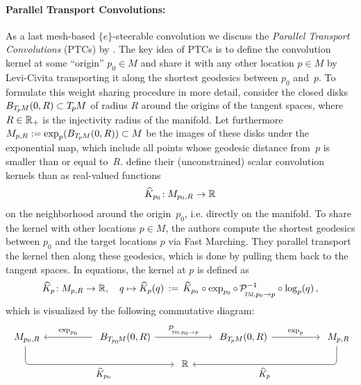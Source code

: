 \paragraph{Parallel Transport Convolutions:}
As a last mesh-based $\{e\}$-steerable convolution we discuss the \emph{Parallel Transport Convolutions} (PTCs) by \citet{schonsheck2018parallel}.
The key idea of PTCs is to define the convolution kernel at some ``origin'' $p_0 \in M$ and share it with any other location $p\in M$ by Levi-Civita transporting it along the shortest geodesics between $p_0$ and~$p$.
To formulate this weight sharing procedure in more detail, consider the closed disks $B_{T_{\mkern-1.5mu p}\mkern-.5muM}(0,R) \subset T_{\mkern-1.5mu p}\mkern-.5muM$ of radius $R$ around the origins of the tangent spaces, where $R\in\mathbb{R}_+$ is the injectivity radius of the manifold.
Let furthermore $M_{p,R} := \exp_p( B_{T_{\mkern-1.5mu p}\mkern-.5muM}(0,R)) \subset M$ be the images of these disks under the exponential map, which include all points whose geodesic distance from~$p$ is smaller than or equal to~$R$.
\citet{schonsheck2018parallel} define their (unconstrained) scalar convolution kernels than as real-valued functions
\begin{align}
    \widehat{K}_{p_0} \!: M_{p_0,R} \to \R
\end{align}
on the neighborhood around the origin~$p_0$, i.e. directly on the manifold.
To share the kernel with other locations $p\in M$, the authors compute the shortest geodesics between $p_0$ and the target locations $p$ via Fast Marching.
They parallel transport the kernel then along these geodesics, which is done by pulling them back to the tangent spaces.
In equations, the kernel at $p$ is defined as
\begin{align}\label{eq:PTCs_kernel_transport}
    \widehat{K}_p \!: M_{p,R} \to \R ,\quad
    q \mapsto \widehat{K}_p(q) \,:=\,
    \widehat{K}_{p_0} \circ \exp_{p_0} \circ\,
    \mathcal{P}_{\mkern-2mu\overset{}{\protect\scalebox{.6}{$\!T\!M$}\mkern-2mu,\mkern1mu p_0\to p}}^{-1}
    \circ \log_p (q) \,,
\end{align}
which is visualized by the following commutative diagram:
\begin{equation}\label{cd:PTC_kernel_1}
\begin{tikzcd}[column sep=50, row sep=10, font=\normalsize]
    M_{p_0,R}
        \arrow[drr, rounded corners, to path={ 
                |-node[below, pos=.8]{\small$\widehat{K}_{p_0}$} ([xshift=-5.ex]\tikztotarget.west) 
                -- (\tikztotarget.west)
                }]
    & B_{T_{\mkern-1.mu p_0}\!M}(0,R)
        \arrow[l, "\exp_{p_0}"']
        \arrow[rr, "\mathcal{P}_{\mkern-2mu\overset{}{\protect\scalebox{.6}{$\!T\!M$}\mkern-2mu,\mkern1mu p_0\to p}}"]
    &[-30pt]
    &[-30pt]
      B_{\TpM}(0,R)
        \arrow[r, "\exp_p"]
    & M_{p,R}
        \arrow[dll, rounded corners, to path={ 
                |-node[below, pos=.8]{\small$\widehat{K}_p$} ([xshift=5.ex]\tikztotarget.east) 
                -- (\tikztotarget.east)
                }]
    \\
    & & \R
\end{tikzcd}
\end{equation}
